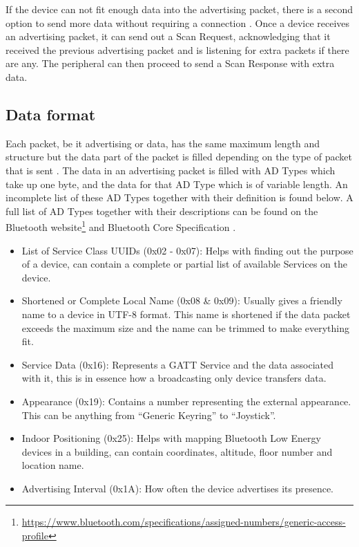 \documentclass[pdftex,a4paper,12pt,twoside]{report}
\begin{document}
If the device can not fit enough data into the advertising packet, there is a second option to send more data without requiring a connection \citep{heydon2012bluetooth}. Once a device receives an advertising packet, it can send out a Scan Request, acknowledging that it received the previous advertising packet and is listening for extra packets if there are any. The peripheral can then proceed to send a Scan Response with extra data.

\subsection{Data format}
\label{subsec:advdataformat}
Each packet, be it advertising or data, has the same maximum length and structure but the data part of the packet is filled depending on the type of packet that is sent \citep{bluetooth2014bluetooth}. The data in an advertising packet is filled with AD Types which take up one byte, and the data for that AD Type which is of variable length. An incomplete list of these AD Types together with their definition is found below. A full list of AD Types together with their descriptions can be found on the Bluetooth website\footnote{\url{https://www.bluetooth.com/specifications/assigned-numbers/generic-access-profile}} and Bluetooth Core Specification \citep{bluetooth2014bluetooth}.

\begin{itemize}
	\item {List of Service Class UUIDs (0x02 - 0x07): Helps with finding out the purpose of a device, can contain a complete or partial list of available Services on the device.}
	\item {Shortened or Complete Local Name (0x08 \& 0x09): Usually gives a friendly name to a device in UTF-8 format. This name is shortened if the data packet exceeds the maximum size and the name can be trimmed to make everything fit.}
	\item {Service Data (0x16): Represents a GATT Service and the data associated with it, this is in essence how a broadcasting only device transfers data.}
	\item {Appearance (0x19): Contains a number representing the external appearance. This can be anything from ``Generic Keyring'' to ``Joystick''.}
	\item {Indoor Positioning (0x25): Helps with mapping Bluetooth Low Energy devices in a building, can contain coordinates, altitude, floor number and location name.}
	\item {Advertising Interval (0x1A): How often the device advertises its presence.}
\end{itemize}
\end{document}
